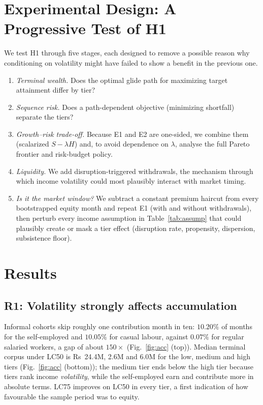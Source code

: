 \documentclass[conference]{IEEEtran}
\begin{document}
\section{Experimental Design: A Progressive Test of H1}
We test H1 through five stages, each designed to remove a possible reason why conditioning on volatility might have failed to show a benefit in the previous one.
\begin{enumerate}
\item[\textbf{E1}] \emph{Terminal wealth.} Does the optimal glide path for maximizing target attainment differ by tier?
\item[\textbf{E2}] \emph{Sequence risk.} Does a path-dependent objective (minimizing shortfall) separate the tiers?
\item[\textbf{E3}] \emph{Growth--risk trade-off.} Because E1 and E2 are one-sided, we combine them (scalarized $S-\lambda H$) and, to avoid dependence on $\lambda$, analyse the full Pareto frontier and risk-budget policy.
\item[\textbf{E4}] \emph{Liquidity.} We add disruption-triggered withdrawals, the mechanism through which income volatility could most plausibly interact with market timing.
\item[\textbf{E5}] \emph{Is it the market window?} We subtract a constant premium haircut from every bootstrapped equity month and repeat E1 (with and without withdrawals), then perturb every income assumption in Table~\ref{tab:assump} that could plausibly create or mask a tier effect (disruption rate, propensity, dispersion, subsistence floor).
\end{enumerate}

\FloatBarrier
\section{Results}
\subsection{R1: Volatility strongly affects accumulation}
Informal cohorts skip roughly one contribution month in ten: $10.20\%$ of months for the self-employed and $10.05\%$ for casual labour, against $0.07\%$ for regular salaried workers, a gap of about $150\times$ (Fig.~\ref{fig:acc} (top)). Median terminal corpus under LC50 is Rs~24.4M, 2.6M and 6.0M for the low, medium and high tiers (Fig.~\ref{fig:acc} (bottom)); the medium tier ends below the high tier because tiers rank income \emph{volatility}, while the self-employed earn and contribute more in absolute terms. LC75 improves on LC50 in every tier, a first indication of how favourable the sample period was to equity.
\end{document}
